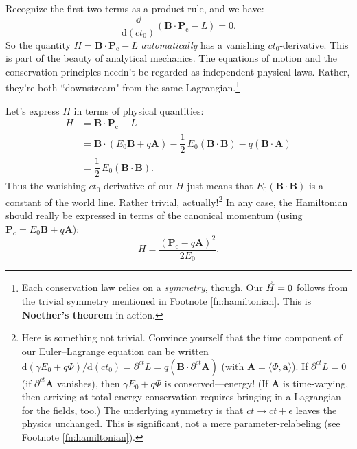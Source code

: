\documentclass[12pt]{article}
\renewcommand{\mathring}[1]{\accentset{\circ}{#1}}
\renewcommand{\vv}[1]{\mathbf{#1}}
\newcommand{\dd}[1]{\mathrm{d}#1}
\begin{document}
Recognize the first two terms as a product rule, and we have:
\begin{equation*}
\dfrac{\dd}{\dd (ct_0)} \left( \vv B \cdot \vv P_\mathrm{c} - L \right) = 0 .
\end{equation*}
So the quantity $H = \vv B \cdot \vv P _\mathrm{c} - L$ \emph{automatically} has a vanishing $ct_0$-derivative. This is part of the beauty of analytical mechanics. The equations of motion and the conservation principles needn't be regarded as independent physical laws. Rather, they're both ``downstream" from the same Lagrangian.\footnote{Each conservation law relies on a \emph{symmetry}, though. Our ${\mathring{H} = 0}$ follows from the trivial symmetry mentioned in Footnote \ref{fn:hamiltonian}. This is \textbf{Noether's theorem} in action.}

Let's express $H$ in terms of physical quantities:
\begin{equation*}
\begin{split}
H &= \vv B \cdot \vv P_\mathrm{c} - L \\
&= \vv B \cdot \left( E_0 \vv B + q \vv A \right) - \dfrac{1}{2} \, E_0 (\vv B \cdot \vv B) - q (\vv B \cdot \vv A) \\
&= \dfrac{1}{2} \, E_0 (\vv B \cdot \vv B) .
\end{split}
\end{equation*}
Thus the vanishing $ct_0$-derivative of our $H$ just means that $E_0 (\vv B \cdot \vv B)$ is a constant of the world line. Rather trivial, actually!\footnote{Here is something not trivial. Convince yourself that the time component of our Euler--Lagrange equation can be written $\dd (\gamma E_0 + q \Phi) / \dd (ct_0) = \partial^{ct} L = q (\vv B \cdot \partial^{ct} \vv A)$ (with $\vv A = \langle \Phi, \vv a \rangle$). If $\partial^{ct} L = 0$ (if $\partial^{ct} \vv A$ vanishes), then $\gamma E_0 + q \Phi$ is conserved---energy! (If $\vv A$ is time-varying, then arriving at total energy-conservation requires bringing in a Lagrangian for the fields, too.) The underlying symmetry is that $ct \rightarrow ct + \epsilon$ leaves the physics unchanged. This is significant, not a mere parameter-relabeling (see Footnote \ref{fn:hamiltonian}).} In any case, the Hamiltonian should really be expressed in terms of the canonical momentum (using ${\vv P_\mathrm{c} = E_0 \vv B + q \vv A }$):
\begin{equation*}
H = \dfrac{\left( \vv P_\mathrm{c} - q \vv A \right) ^2}{2 E_0} .
\end{equation*}
\end{document}
